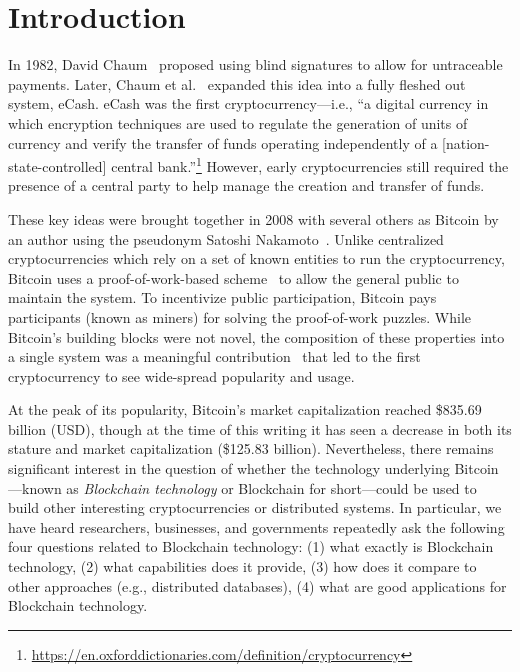
\section{Introduction}

In 1982, David Chaum~\cite{Cha82} proposed using blind signatures to allow for untraceable payments.
Later, Chaum et al.~\cite{chaum1988untraceable} expanded this idea into a fully fleshed out system, eCash.
eCash was the first cryptocurrency---i.e., ``a digital currency in which encryption techniques are used to regulate the generation of units of currency and verify the transfer of funds operating independently of a [nation-state-controlled] central bank.''\footnote{\url{https://en.oxforddictionaries.com/definition/cryptocurrency}}
However, early cryptocurrencies still required the presence of a central party to help manage the creation and transfer of funds.

These key ideas were brought together in 2008 with several others as Bitcoin by an author using the pseudonym Satoshi Nakamoto~\cite{Nak08}. Unlike centralized cryptocurrencies which rely on a set of known entities to run the cryptocurrency, Bitcoin uses a proof-of-work-based scheme~\cite{DN93,back1997partial} to allow the general public to maintain the system.
To incentivize public participation, Bitcoin pays participants (known as miners) for solving the proof-of-work puzzles.
While Bitcoin's building blocks were not novel, the composition of these properties into a single system was a meaningful contribution~\cite{Narayanan17} that led to the first cryptocurrency to see wide-spread popularity and usage.

At the peak of its popularity, Bitcoin's market capitalization reached \$835.69 billion (USD), though at the time of this writing it has seen a decrease in both its stature and market capitalization (\$125.83 billion).
Nevertheless, there remains significant interest in the question of whether the technology underlying Bitcoin---known as \emph{Blockchain technology} or {Blockchain} for short---could be used to build other interesting cryptocurrencies or distributed systems.
In particular, we have heard researchers, businesses, and governments repeatedly ask the following four questions related to Blockchain technology: (1) what exactly is Blockchain technology, (2) what capabilities does it provide, (3) how does it compare to other approaches (e.g., distributed databases), (4) what are good applications for Blockchain technology.

